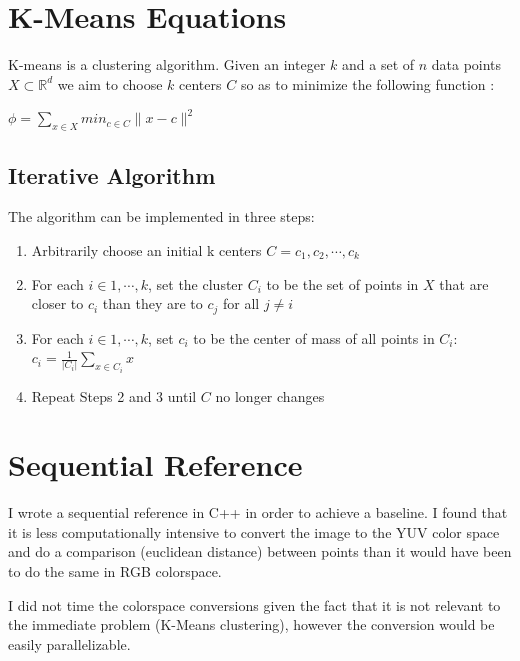 \documentclass[11pt]{article}
\begin{document}
\maketitle

\section{K-Means Equations}

K-means is a clustering algorithm. Given an integer $k$ and a set of $n$ data points $X \subset \mathbb{R}^d$ we aim to choose $k$ centers $C$ so as to minimize the following function \cite{arthur}:
\newline

\begin{math}
\phi = \displaystyle\sum_{x \in X} min_{c \in C }\| x - c \|^2
\end{math}

\subsection{Iterative Algorithm}
The algorithm can be implemented in three steps:

\begin{enumerate}
\item Arbitrarily choose an initial k centers $C = {c_1, c_2, \cdots, c_k}$
\item For each $i \in {1, \cdots, k}$, set the cluster $C_i$ to be the set of points in $X$ that are closer to $c_i$ than they are to $c_j$ for all $j \neq i$
\item For each $i \in {1, \cdots, k}$, set $c_i$ to be the center of mass of all points in $C_i$: $c_i = \frac{1}{|C_i|}\sum_{x \in C_i}x$
\item Repeat Steps 2 and 3 until $C$ no longer changes
\end{enumerate}

\section{Sequential Reference}

I wrote a sequential reference in C++ in order to achieve a baseline. I found that
it is less computationally intensive to convert the image to the YUV color space and
do a comparison (euclidean distance) between points than it would have been to do
the same in RGB colorspace.

I did not time the colorspace conversions given the fact that it is not relevant to the
immediate problem (K-Means clustering), however the conversion would be easily
parallelizable.
\end{document}
